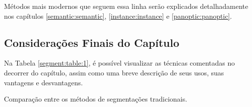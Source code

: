 Métodos mais modernos que seguem essa linha serão explicados detalhadamente nos capítulos \ref{semantic:semantic}, \ref{instance:instance} e \ref{panoptic:panoptic}.


\subsection{Considerações Finais do Capítulo}
\label{segment:conclusion}

Na Tabela \ref{segment:table:1}, é possível visualizar as técnicas comentadas no decorrer do capítulo, assim como uma breve descrição de seus usos, suas vantagens e desvantagens.

\begin{table}[H]
\centering
\caption{Comparação entre os métodos de segmentações tradicionais.}
\label{segment:table:1}
\resizebox{\textwidth}{!}{%

}
\end{table}
